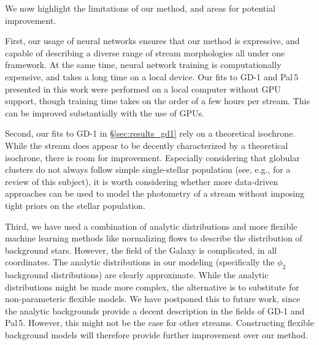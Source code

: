\documentclass[twocolumn, linenumbers]{aastex631}
\newcommand{\stream}[1]{#1}
\begin{document}
        We now highlight the limitations of our method, and areas for potential
        improvement.
    
        First, our usage of neural networks ensures that our method is
        expressive, and capable of describing a diverse range of stream
        morphologies all under one framework. At the same time, neural network
        training is computationally expensive, and takes a long time on a local
        device. Our fits to \stream{GD-1} and \stream{Pal\,5} presented in this
        work were performed on a local computer without GPU support, though
        training time takes on the order of a few hours per stream. This can be
        improved substantially with the use of GPUs.
    
        Second, our fits to \stream{GD-1} in \S\ref{sec:results_gd1} rely on a
        theoretical isochrone. While the stream does appear to be decently
        characterized by a theoretical isochrone, there is room for improvement.
        Especially considering that globular clusters do not always follow
        simple single-stellar population (see, e.g., \citealt{MiloneMarino2022}
        for a review of this subject), it is worth considering whether more
        data-driven approaches can be used to model the photometry of a stream
        without imposing tight priors on the stellar population. 
    
        Third, we have used a combination of analytic distributions and more
        flexible machine learning methods like normalizing flows to describe the
        distribution of background stars. However, the field of the Galaxy is
        complicated, in all coordinates. The analytic distributions in our
        modeling (specifically the $\phi_2$ background distributions) are
        clearly approximate. While the analytic distributions might be made more
        complex, the alternative is to substitute for non-parameteric flexible
        models. We have postponed this to future work, since the analytic
        backgrounds provide a decent description in the fields of \stream{GD-1}
        and \stream{Pal\,5}. However, this might not be the case for other
        streams. Constructing flexible background models will therefore provide
        further improvement over our method.
\end{document}
